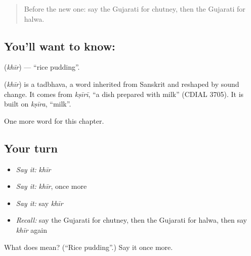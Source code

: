 \label{lesson:GU-C117-khir}



\begin{quote}
Before the new one: say the Gujarati for chutney, then the Gujarati for halwa.
\end{quote}

\subsection*{You'll want to know: }
\textbf{} (\emph{khīr}) — \textquotedblleft{}rice pudding\textquotedblright{}.

\begin{cousinweb}
\textbf{} (\emph{khīr}) is a tadbhava, a word inherited from Sanskrit and reshaped by sound change. It comes from \emph{kṣīrī}, \textquotedblleft{}a dish prepared with milk\textquotedblright{} (CDIAL 3705). It is built on \emph{kṣīra}, \textquotedblleft{}milk\textquotedblright{}.
\end{cousinweb}

\begin{grammarlens}[title={What you've built}]
One more word for this chapter.
\end{grammarlens}

\subsection*{Your turn}
\begin{itemize}
\raggedright
  \item \emph{Say it:} \emph{khīr}
  \item \emph{Say it:} \emph{khīr}, once more
  \item \emph{Say it:} say \emph{khīr}
  \item \emph{Recall:} say the Gujarati for chutney, then the Gujarati for halwa, then say \emph{khīr} again
\end{itemize}

\begin{tcolorbox}[breakable,colback=teal!4,colframe=teal!35!black,title={Before you move on}]
What does  mean? (\textquotedblleft{}Rice pudding\textquotedblright{}.) Say it once more.
\end{tcolorbox}
